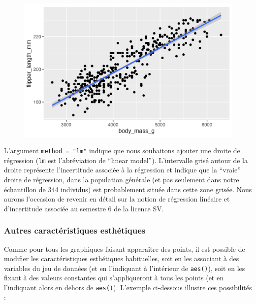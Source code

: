 \documentclass[
  letterpaper,
  DIV=11,
  numbers=noendperiod]{scrreprt}
\begin{document}
\begin{figure}[H]

{\centering \includegraphics{./03-visualization_files/figure-pdf/unnamed-chunk-48-1.png}

}

\end{figure}

L'argument \texttt{method\ =\ "lm"} indique que nous souhaitons ajouter
une droite de régression (\texttt{lm} est l'abréviation de ``linear
model''). L'intervalle grisé autour de la droite représente
l'incertitude associée à la régression et indique que la ``vraie''
droite de régression, dans la population générale (et pas seulement dans
notre échantillon de 344 individus) est probablement située dans cette
zone grisée. Nous aurons l'occasion de revenir en détail sur la notion
de régression linéaire et d'incertitude associée au semestre 6 de la
licence SV.

\hypertarget{autres-caractuxe9ristiques-esthuxe9tiques}{%
\subsubsection{Autres caractéristiques
esthétiques}\label{autres-caractuxe9ristiques-esthuxe9tiques}}

Comme pour tous les graphiques faisant apparaître des points, il est
possible de modifier les caractéristiques esthétiques habituelles, soit
en les associant à des variables du jeu de données (et en l'indiquant à
l'intérieur de \texttt{aes()}), soit en les fixant à des valeurs
constantes qui s'appliqueront à tous les points (et en l'indiquant alors
en dehors de \texttt{aes()}). L'exemple ci-dessous illustre ces
possibilités :
\end{document}
